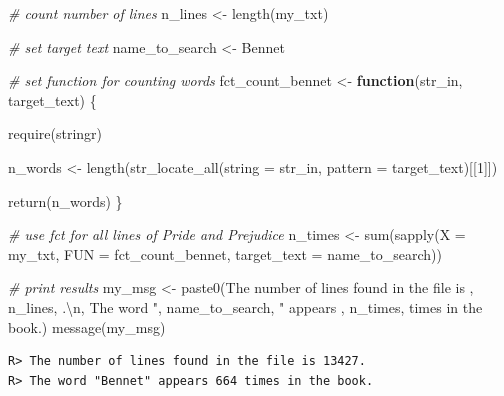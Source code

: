 \documentclass[
  11pt,
]{book}
\newenvironment{Shaded}{\begin{snugshade}}{\end{snugshade}}
\newcommand{\AttributeTok}[1]{\textcolor[rgb]{0.61,0.61,0.61}{#1}}
\newcommand{\CommentTok}[1]{\textcolor[rgb]{0.37,0.37,0.37}{\textit{#1}}}
\newcommand{\ControlFlowTok}[1]{\textcolor[rgb]{0.27,0.27,0.27}{\textbf{#1}}}
\newcommand{\DecValTok}[1]{\textcolor[rgb]{0.06,0.06,0.06}{#1}}
\newcommand{\FunctionTok}[1]{\textcolor[rgb]{0,0,0}{#1}}
\newcommand{\NormalTok}[1]{#1}
\newcommand{\OtherTok}[1]{\textcolor[rgb]{0.37,0.37,0.37}{#1}}
\newcommand{\SpecialCharTok}[1]{\textcolor[rgb]{0,0,0}{#1}}
\newcommand{\StringTok}[1]{\textcolor[rgb]{0.5,0.5,0.5}{#1}}
\begin{document}
\begin{Shaded}
\begin{Highlighting}[]
\CommentTok{\# count number of lines}
\NormalTok{n\_lines }\OtherTok{\textless{}{-}} \FunctionTok{length}\NormalTok{(my\_txt)}

\CommentTok{\# set target text}
\NormalTok{name\_to\_search }\OtherTok{\textless{}{-}} \StringTok{\textquotesingle{}Bennet\textquotesingle{}}

\CommentTok{\# set function for counting words}
\NormalTok{fct\_count\_bennet }\OtherTok{\textless{}{-}} \ControlFlowTok{function}\NormalTok{(str\_in, target\_text) \{}
  
  \FunctionTok{require}\NormalTok{(stringr)}
  
  
\NormalTok{  n\_words }\OtherTok{\textless{}{-}} \FunctionTok{length}\NormalTok{(}\FunctionTok{str\_locate\_all}\NormalTok{(}\AttributeTok{string =}\NormalTok{ str\_in, }
                                   \AttributeTok{pattern =}\NormalTok{ target\_text)[[}\DecValTok{1}\NormalTok{]])}
  
  \FunctionTok{return}\NormalTok{(n\_words)}
\NormalTok{\}}

\CommentTok{\# use fct for all lines of Pride and Prejudice}
\NormalTok{n\_times }\OtherTok{\textless{}{-}} \FunctionTok{sum}\NormalTok{(}\FunctionTok{sapply}\NormalTok{(}\AttributeTok{X =}\NormalTok{ my\_txt, }
                      \AttributeTok{FUN =}\NormalTok{ fct\_count\_bennet, }
                      \AttributeTok{target\_text =}\NormalTok{ name\_to\_search))}

\CommentTok{\# print results}
\NormalTok{my\_msg }\OtherTok{\textless{}{-}} \FunctionTok{paste0}\NormalTok{(}\StringTok{\textquotesingle{}The number of lines found in the file is \textquotesingle{}}\NormalTok{, }
\NormalTok{                 n\_lines, }\StringTok{\textquotesingle{}.}\SpecialCharTok{\textbackslash{}n}\StringTok{\textquotesingle{}}\NormalTok{,}
                 \StringTok{\textquotesingle{}The word "\textquotesingle{}}\NormalTok{, name\_to\_search, }\StringTok{\textquotesingle{}" appears \textquotesingle{}}\NormalTok{, }
\NormalTok{                 n\_times, }\StringTok{\textquotesingle{} times in the book.\textquotesingle{}}\NormalTok{)}
\FunctionTok{message}\NormalTok{(my\_msg)}
\end{Highlighting}
\end{Shaded}

\begin{verbatim}
R> The number of lines found in the file is 13427.
R> The word "Bennet" appears 664 times in the book.
\end{verbatim}
\end{document}
